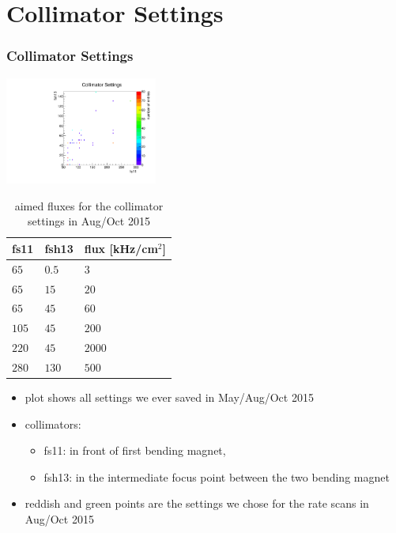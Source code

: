 \documentclass[9pt]{beamer}
\begin{document}
\section{Collimator Settings}
\begin{frame}
	\frametitle{Collimator Settings}
	\begin{minipage}{6cm}
		\centering
		\includegraphics[angle=270, width=5cm]{CollimatorSettings}
	\end{minipage}
	\hspace*{2pt}
	\begin{minipage}{5cm}
		\begin{table}[c]
			\small
			\begin{tabular}{l|l|l}\toprule
				fs11	& fsh13	& flux [kHz/cm$^{2}$]\\\hline
				$65$	& $0.5$ & $3$\\\hline
				$65$	& $15$ & $20$\\\hline
				$65$	& $45$ & $60$\\\hline
				$105$	& $45$ & $200$\\\hline
				$220$	& $45$ & $2000$\\\hline
				$280$	& $130$ & $500$\\
				\bottomrule
			\end{tabular}
			\caption{aimed fluxes for the collimator settings in Aug/Oct 2015}
		\end{table}
	\end{minipage}
	\begin{itemize}
		\item plot shows all settings we ever saved in May/Aug/Oct 2015
		\item collimators:
		\begin{itemize}
			\item fs11: in front of first bending magnet,
			\item fsh13: in the intermediate focus point between the two bending magnet
		\end{itemize}
		\item reddish and green points are the settings we chose for the rate scans in Aug/Oct 2015
	\end{itemize}
\end{frame}
\end{document}
